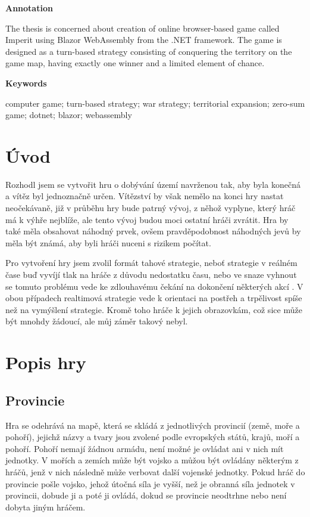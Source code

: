 \documentclass[a4paper,12pt]{article}
\begin{document}
\Large\textbf{Annotation}\normalsize

The thesis is concerned about creation of online browser-based game called Imperit using Blazor WebAssembly from the .NET framework. The game is designed as a turn-based strategy consisting of conquering the territory on the game map, having exactly one winner and a limited element of chance.

\Large\textbf{Keywords}\normalsize

computer game; turn-based strategy; war strategy; territorial expansion; zero-sum game;\- dotnet; blazor; webassembly
\newpage
\thispagestyle{empty}
\tableofcontents
\newpage
\section{Úvod}
Rozhodl jsem se vytvořit hru o dobývání území navrženou tak, aby byla konečná a vítěz byl jednoznačně určen. Vítězství by však nemělo na konci hry nastat neočekávaně, již v průběhu hry bude patrný vývoj, z něhož vyplyne, který hráč má k výhře nejblíže, ale tento vývoj budou moci ostatní hráči zvrátit. Hra by také měla obsahovat náhodný prvek, ovšem pravděpodobnost náhodných jevů by měla být známá, aby byli hráči nuceni s rizikem počítat.

Pro vytvoření hry jsem zvolil formát tahové strategie, neboť strategie v reálném čase buď vyvíjí tlak na hráče z důvodu nedostatku času, nebo ve snaze vyhnout se tomuto problému vede ke zdlouhavému čekání na dokončení některých akcí \cite{turnreal1}. V obou případech realtimová strategie vede k orientaci na postřeh a trpělivost spíše než na vymýšlení strategie\cite{turnreal2}. Kromě toho  hráče k jejich obrazovkám, což sice může být mnohdy žádoucí, ale můj záměr takový nebyl.

\section{Popis hry}
\subsection{Provincie}
Hra se odehrává na mapě, která se skládá z jednotlivých provincií (země, moře a pohoří), jejichž názvy a tvary jsou zvolené podle evropských států, krajů, moří a pohoří. Pohoří nemají žádnou armádu, není možné je ovládat ani v nich mít jednotky. V mořích a zemích může být vojsko a můžou být ovládány některým z hráčů, jenž v nich následně může verbovat další vojenské jednotky. Pokud hráč do provincie pošle vojsko, jehož útočná síla je vyšší, než je obranná síla jednotek v provincii, dobude ji a poté ji ovládá, dokud se provincie neodtrhne nebo není dobyta jiným hráčem.
\end{document}
